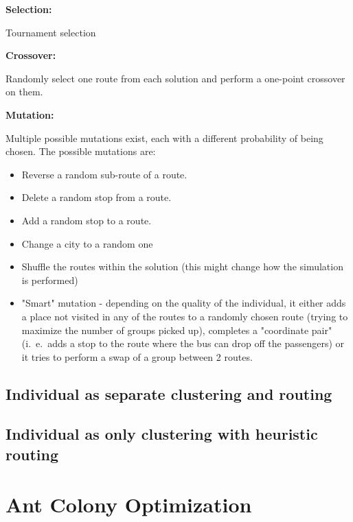\textbf{Selection:}

Tournament selection

\textbf{Crossover:}

Randomly select one route from each solution and perform a one-point crossover on them.

\textbf{Mutation:}

Multiple possible mutations exist, each with a different probability of being chosen. The possible mutations are:
\begin{itemize}
    \item Reverse a random sub-route of a route.
    \item Delete a random stop from a route.
    \item Add a random stop to a route.
    \item Change a city to a random one
    \item Shuffle the routes within the solution (this might change how the simulation is performed)
    \item "Smart" mutation - depending on the quality of the individual, it either adds a place not visited in any of the routes to a randomly chosen route (trying to maximize the number of groups picked up), completes a "coordinate pair" (i.\ e.\ adds a stop to the route where the bus can drop off the passengers) or it tries to perform a swap of a group between 2 routes.
\end{itemize}

\subsection{Individual as separate clustering and routing}


\subsection{Individual as only clustering with heuristic routing}


\section{Ant Colony Optimization}


